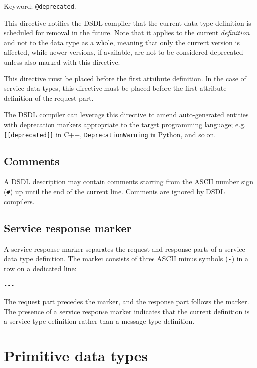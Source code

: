 Keyword: \verb|@deprecated|.

This directive notifies the DSDL compiler that the current data type definition
is scheduled for removal in the future.
Note that it applies to the current \emph{definition} and not to the data type as a whole,
meaning that only the current version is affected, while newer versions,
if available, are not to be considered deprecated unless also marked with this directive.

This directive must be placed before the first attribute definition.
In the case of service data types, this directive must be placed before the first
attribute definition of the request part.

The DSDL compiler can leverage this directive to amend auto-generated entities with
deprecation markers appropriate to the target programming language;
e.g. \verb|[[deprecated]]| in C++, \verb|DeprecationWarning| in Python, and so on.

\subsection{Comments}

A DSDL description may contain comments starting from the ASCII number sign (\verb|#|)
up until the end of the current line.
Comments are ignored by DSDL compilers.

\subsection{Service response marker}\label{sec:dsdl_service_response_marker}

A service response marker separates the request and response parts of a service data type definition.
The marker consists of three ASCII minus symbols (\verb|-|) in a row on a dedicated line:

\begin{verbatim}
---
\end{verbatim}

The request part precedes the marker, and the response part follows the marker.
The presence of a service response marker indicates that the current definition is a
service type definition rather than a message type definition.

\section{Primitive data types}\label{sec:dsdl_primitive_data_types}

